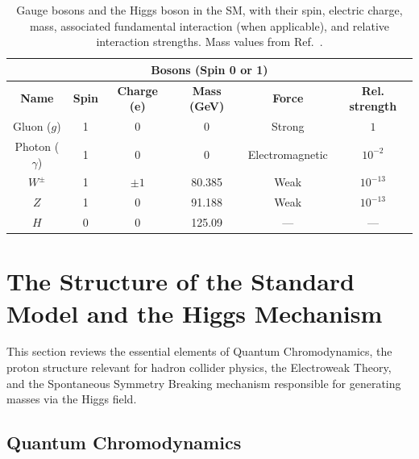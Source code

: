 \begin{table}[htbp]
\centering
\caption{Gauge bosons and the Higgs boson in the SM, with their spin, electric charge, mass, associated fundamental interaction (when applicable), and relative interaction strengths. Mass values from Ref.~\cite{PhysRevD.98.030001}.}
\small
\renewcommand{\arraystretch}{1.2}
\setlength{\tabcolsep}{6pt}
\begin{tabular}{cccccc}
\multicolumn{6}{c}{\textbf{Bosons (Spin 0 or 1)}} \\
\toprule
\textbf{Name} & \textbf{Spin} & \textbf{Charge (e)} & \textbf{Mass (GeV)} & \textbf{Force} & \textbf{Rel. strength} \\
\midrule
Gluon ($g$)     & 1 & 0        & 0       & Strong         & $1$ \\
Photon ($\gamma$) & 1 & 0        & 0       & Electromagnetic & $10^{-2}$ \\
$W^{\pm}$       & 1 & $\pm 1$  & 80.385  & Weak           & $10^{-13}$ \\
$Z$             & 1 & 0        & 91.188  & Weak           & $10^{-13}$ \\
$H$             & 0 & 0        & 125.09  & —              & — \\
\bottomrule
\end{tabular}
\label{tab:bosons}
\end{table}



\section{The Structure of the Standard Model and the Higgs Mechanism}
\label{sec:sm_higgs_mech}


This section reviews the essential elements of Quantum Chromodynamics, the proton structure relevant for hadron collider physics, the Electroweak Theory, and the Spontaneous Symmetry Breaking mechanism responsible for generating masses via the Higgs field.


\subsection{Quantum Chromodynamics}
\label{subsec:QCD}

